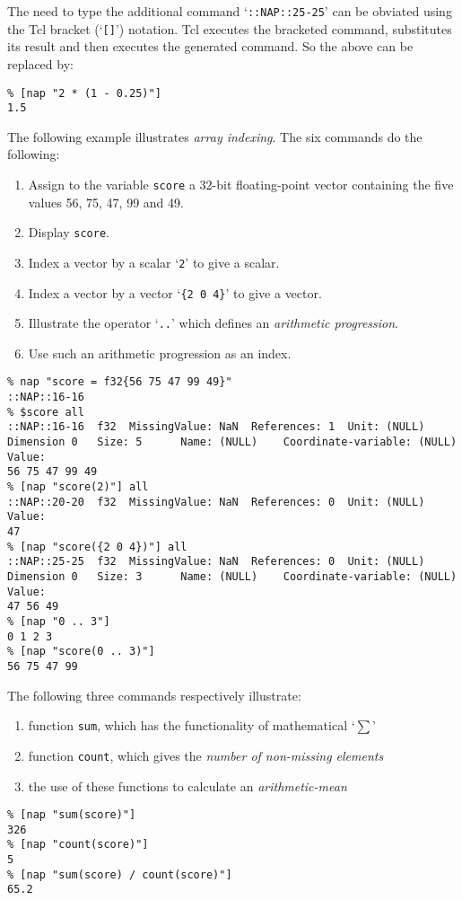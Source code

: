 The need to type the additional command `\texttt{::NAP::25-25}' can be obviated using the Tcl
    bracket (`\texttt{[]}') notation. Tcl executes the bracketed
    command, substitutes its result and then executes the generated
    command. So the above can be replaced by:
    \begin{verbatim}
% [nap "2 * (1 - 0.25)"]
1.5
\end{verbatim}

    

The following example illustrates 
    \emph{array indexing}. The six commands do the following:
    \begin{enumerate}
      \item Assign to the variable 
      \texttt{score} a 32-bit floating-point vector containing the
      five values 56, 75, 47, 99 and 49.
      \item Display 
      \texttt{score}.
      \item Index a vector by a scalar `\texttt{2}' to give a scalar.
      \item Index a vector by a vector `\texttt{\{2 0 4\}}' to give a vector.
      \item Illustrate the operator `\texttt{..}' which defines an 
      \emph{arithmetic progression}.
      \item Use such an arithmetic progression as an index.
    \end{enumerate}
    \begin{verbatim}
% nap "score = f32{56 75 47 99 49}"
::NAP::16-16
% $score all
::NAP::16-16  f32  MissingValue: NaN  References: 1  Unit: (NULL)
Dimension 0   Size: 5      Name: (NULL)    Coordinate-variable: (NULL)
Value:
56 75 47 99 49
% [nap "score(2)"] all
::NAP::20-20  f32  MissingValue: NaN  References: 0  Unit: (NULL)
Value:
47
% [nap "score({2 0 4})"] all
::NAP::25-25  f32  MissingValue: NaN  References: 0  Unit: (NULL)
Dimension 0   Size: 3      Name: (NULL)    Coordinate-variable: (NULL)
Value:
47 56 49
% [nap "0 .. 3"]
0 1 2 3
% [nap "score(0 .. 3)"]
56 75 47 99
\end{verbatim}

The following three commands respectively illustrate:
    \begin{enumerate}
      \item function \texttt{sum}, which has the functionality of mathematical `$\sum$'
      \item function \texttt{count}, which gives the \emph{number of non-missing elements}
      \item the use of these functions to calculate an \emph{arithmetic-mean}
    \end{enumerate}
    \begin{verbatim}
% [nap "sum(score)"]
326
% [nap "count(score)"]
5
% [nap "sum(score) / count(score)"]
65.2
\end{verbatim}

